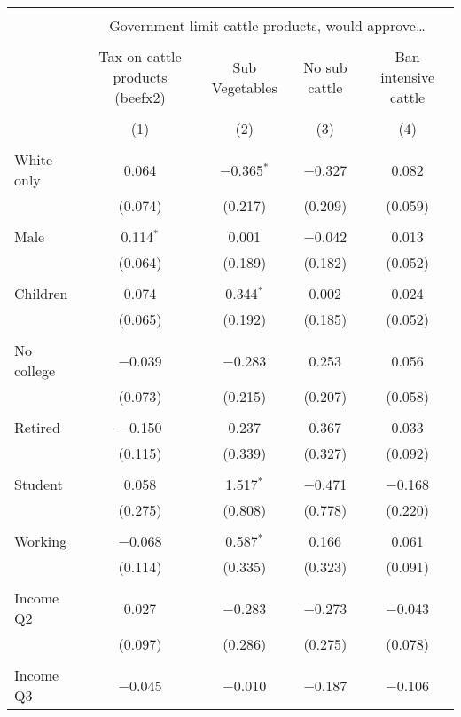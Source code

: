 
\begin{tabular}{@{\extracolsep{5pt}}lcccc} 
\\[-1.8ex]\hline 
\hline \\[-1.8ex] 
 & \multicolumn{4}{c}{Government limit cattle products, would approve…} \\ 
\cline{2-5} 
\\[-1.8ex] & Tax on cattle products (beefx2) & Sub Vegetables & No sub cattle & Ban intensive cattle \\ 
\\[-1.8ex] & (1) & (2) & (3) & (4)\\ 
\hline \\[-1.8ex] 
 White only & 0.064 & $-$0.365$^{*}$ & $-$0.327 & 0.082 \\ 
  & (0.074) & (0.217) & (0.209) & (0.059) \\ 
  & & & & \\ 
 Male & 0.114$^{*}$ & 0.001 & $-$0.042 & 0.013 \\ 
  & (0.064) & (0.189) & (0.182) & (0.052) \\ 
  & & & & \\ 
 Children & 0.074 & 0.344$^{*}$ & 0.002 & 0.024 \\ 
  & (0.065) & (0.192) & (0.185) & (0.052) \\ 
  & & & & \\ 
 No college & $-$0.039 & $-$0.283 & 0.253 & 0.056 \\ 
  & (0.073) & (0.215) & (0.207) & (0.058) \\ 
  & & & & \\ 
 Retired & $-$0.150 & 0.237 & 0.367 & 0.033 \\ 
  & (0.115) & (0.339) & (0.327) & (0.092) \\ 
  & & & & \\ 
 Student & 0.058 & 1.517$^{*}$ & $-$0.471 & $-$0.168 \\ 
  & (0.275) & (0.808) & (0.778) & (0.220) \\ 
  & & & & \\ 
 Working & $-$0.068 & 0.587$^{*}$ & 0.166 & 0.061 \\ 
  & (0.114) & (0.335) & (0.323) & (0.091) \\ 
  & & & & \\ 
 Income Q2 & 0.027 & $-$0.283 & $-$0.273 & $-$0.043 \\ 
  & (0.097) & (0.286) & (0.275) & (0.078) \\ 
  & & & & \\ 
 Income Q3 & $-$0.045 & $-$0.010 & $-$0.187 & $-$0.106 \\ 

\end{tabular}

